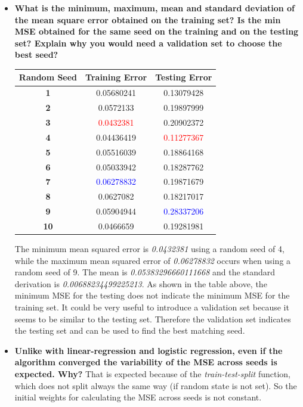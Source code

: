 \documentclass[a4paper]{article}
\begin{document}
\begin{enumerate}[label=(\alph*)]
\begin{itemize}
\item \textbf{What is the minimum, maximum, mean and standard deviation of the mean square error obtained on the training set? Is the min MSE obtained for the same seed on the training and on the testing set? Explain why you would need a validation set to choose the best seed?}

\begin{table}[!h]
\centering
\label{ad}
\begin{tabular}{|c|c|c|}
\hline
\textbf{Random Seed} & \textbf{Training Error} & \textbf{Testing Error} \\ \hline
\textbf{1}  &0.05680241   & 0.13079428 \\ \hline
\textbf{2}  &0.0572133   & 0.19897999 \\ \hline
\textbf{3}  &\textcolor{red}{0.0432381}   & 0.20902372 \\ \hline
\textbf{4}  &0.04436419   & \textcolor{red}{0.11277367} \\ \hline
\textbf{5}  &0.05516039   & 0.18864168 \\ \hline
\textbf{6}  &0.05033942   & 0.18287762 \\ \hline
\textbf{7}  &\textcolor{blue}{0.06278832}   & 0.19871679 \\ \hline
\textbf{8}  &0.0627082   & 0.18217017 \\ \hline
\textbf{9}  &0.05904944   & \textcolor{blue}{0.28337206} \\ \hline
\textbf{10} &0.0466659   & 0.19281981 \\ \hline
\end{tabular}
\end{table}

The minimum mean squared error is \textit{0.0432381} using a random seed of 4, while the maximum mean squared error of \textit{0.06278832} occurs when using a random seed of 9. The mean is \textit{0.05383296660111668} and the standard derivation is \textit{0.00688234499225213}.
\newline \newline
As shown in the table above, the minimum MSE for the testing does not indicate the minimum MSE for the training set. It could be very useful to introduce a validation set because it seems to be similar to the testing set. Therefore the validation set indicates the testing set and can be used to find the best matching seed. \\

\item \textbf{Unlike with linear-regression and logistic regression, even if the algorithm converged the variability of the MSE across seeds is expected. Why?}
\newline \newline
That is expected because of the \textit{train-test-split} function, which does not split always the same way (if random state is not set). So the initial weights for calculating the MSE across seeds is not constant. \\


\end{itemize}
\end{enumerate}
\end{document}
